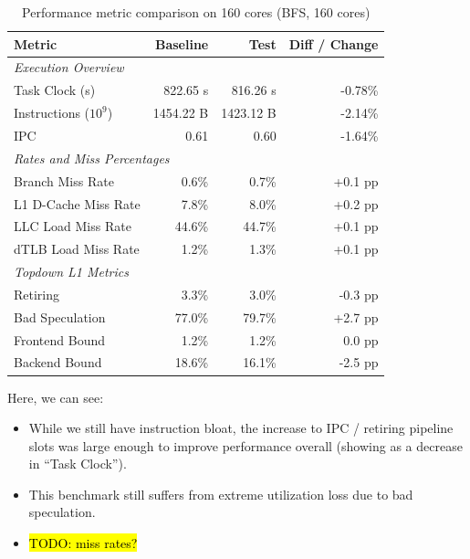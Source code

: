 \documentclass[leqno,11pt]{article}
\begin{document}
\begin{table}[htbp]
  \centering
  \caption{Performance metric comparison on 160 cores (BFS, 160 cores)}
  \label{tab:perf_comparison_bfs_160cores}
  \begin{tabular}{lrrr}
    \toprule
    \textbf{Metric} & \textbf{Baseline} & \textbf{Test} & \textbf{Diff / Change} \\
    \midrule
    \multicolumn{4}{l}{\textit{Execution Overview}} \\
    \quad Task Clock (s)           & 822.65 s   & 816.26 s   & -0.78\%   \\
    \quad Instructions ($10^9$)    & 1454.22 B  & 1423.12 B  & -2.14\%   \\
    \quad IPC                      & 0.61       & 0.60       & -1.64\%   \\
    \midrule
    \multicolumn{4}{l}{\textit{Rates and Miss Percentages}} \\
    \quad Branch Miss Rate         & 0.6\%      & 0.7\%      & +0.1 pp   \\
    \quad L1 D-Cache Miss Rate     & 7.8\%      & 8.0\%      & +0.2 pp   \\
    \quad LLC Load Miss Rate       & 44.6\%     & 44.7\%     & +0.1 pp   \\
    \quad dTLB Load Miss Rate      & 1.2\%      & 1.3\%      & +0.1 pp   \\
    \midrule
    \multicolumn{4}{l}{\textit{Topdown L1 Metrics}} \\
    \quad Retiring                 & 3.3\%      & 3.0\%      & -0.3 pp   \\
    \quad Bad Speculation          & 77.0\%     & 79.7\%     & +2.7 pp   \\
    \quad Frontend Bound           & 1.2\%      & 1.2\%      & 0.0 pp    \\
    \quad Backend Bound            & 18.6\%     & 16.1\%     & -2.5 pp   \\
    \bottomrule
  \end{tabular}
\end{table}
Here, we can see:
\begin{itemize}
\item While we still have instruction bloat, the increase to IPC / retiring
  pipeline slots was large enough to improve performance overall (showing as a
  decrease in ``Task Clock'').
\item This benchmark still suffers from extreme utilization loss due to bad speculation.
\item \hl{TODO: miss rates?}
\end{itemize}
\end{document}
